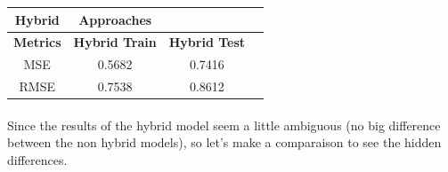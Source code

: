 \documentclass{cup-pan}
\begin{document}
\begin{center} 
  \begin{tabular}{||c||c|c|c||}
    \hline\hline 
    \textbf{Hybrid} & \multicolumn{1}{c}{\hspace{1.5cm}\textbf{Approaches}} & \multicolumn{1}{c||}{\hspace{-1.5cm}\textbf{}} \\
    \hline\hline 
    \multicolumn{1}{||c||}{\textbf{Metrics}} & \textbf{Hybrid Train} & \textbf{Hybrid Test} \\
    \hline 
    MSE & 0.5682 & 0.7416 \\
    RMSE & 0.7538 & 0.8612 \\
    \hline\hline
  \end{tabular}
\end{center}
\paragraph{}
Since the results of the hybrid model seem a little ambiguous (no big difference between the non hybrid models), so let's make a comparaison to see the hidden differences.
\end{document}
